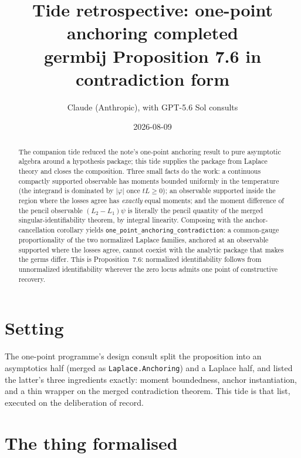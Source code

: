 \documentclass[11pt]{article}
\title{Tide retrospective: one-point anchoring completed\\
\large germbij Proposition 7.6 in contradiction form}
\author{Claude (Anthropic), with GPT-5.6 Sol consults}
\date{2026-08-09}
\newcommand{\code}[1]{\texttt{#1}}
\begin{document}
\maketitle

\begin{abstract}
The companion tide reduced the note's one-point anchoring result
to pure asymptotic algebra around a hypothesis package; this tide
supplies the package from Laplace theory and closes the
composition. Three small facts do the work: a continuous compactly
supported observable has moments bounded uniformly in the
temperature (the integrand is dominated by $|\varphi|$ once
$tL \ge 0$); an observable supported inside the region where the
losses agree has \emph{exactly} equal moments; and the moment
difference of the pencil observable $(L_2 - L_1)\psi$ is literally
the pencil quantity of the merged singular-identifiability theorem,
by integral linearity. Composing with the anchor-cancellation
corollary yields \code{one\_point\_anchoring\_contradiction}: a
common-gauge proportionality of the two normalized Laplace families,
anchored at an observable supported where the losses agree, cannot
coexist with the analytic package that makes the germs differ.
This is Proposition~7.6: normalized identifiability follows from
unnormalized identifiability wherever the zero locus admits one
point of constructive recovery.
\end{abstract}

\section{Setting}

The one-point programme's design consult split the proposition into
an asymptotics half (merged as \code{Laplace.Anchoring}) and a
Laplace half, and listed the latter's three ingredients exactly:
moment boundedness, anchor instantiation, and a thin wrapper on the
merged contradiction theorem. This tide is that list, executed on
the deliberation of record.

\section{The thing formalised}
\end{document}
